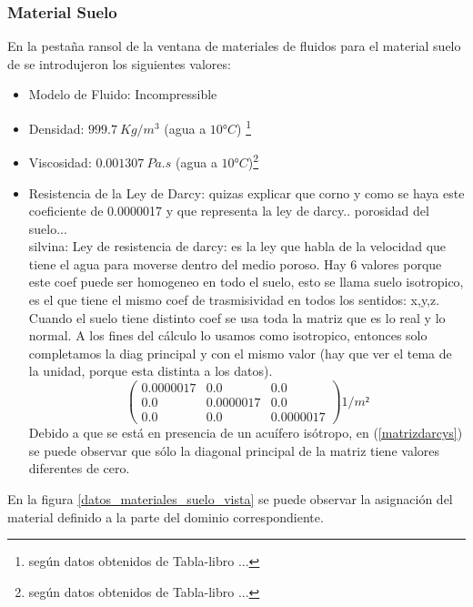 \documentclass[10pt,a4paper,final]{article}
\begin{document}
\subsubsection{Material Suelo}
En la pestaña ransol de la ventana de materiales de fluidos para el material suelo de  se introdujeron los siguientes valores:
\begin{itemize}
\item Modelo de Fluido: Incompressible
\item Densidad: $999.7~Kg/m^3$ (agua a $10° C$) \footnote{ según datos obtenidos de Tabla-libro ...}
\item Viscosidad: $0.001307~Pa.s$ (agua a $10° C$)\footnote{ según datos obtenidos de Tabla-libro ...}
\item Resistencia de la Ley de Darcy:
quizas explicar que corno y como se haya este coeficiente de 0.0000017 y que representa la ley de darcy.. porosidad del suelo...\\
silvina: Ley de resistencia de darcy: es la ley que habla de la velocidad que tiene el agua para moverse dentro del medio poroso. Hay 6 valores porque este coef puede ser homogeneo en todo el suelo, esto se llama suelo isotropico, es el que tiene el mismo coef de trasmisividad en todos los sentidos: x,y,z. Cuando el suelo tiene distinto coef se usa toda la matriz que es lo real y lo normal. A los fines del cálculo lo usamos como isotropico, entonces solo completamos la diag principal y con el mismo valor (hay que ver el tema de la unidad, porque esta distinta a los datos). 
\begin{equation}
\begin{pmatrix}{}
0.0000017 & 0.0 & 0.0 \\ 
0.0 & 0.0000017 & 0.0 \\ 
0.0 & 0.0 & 0.0000017
\end{pmatrix} 1/m²
\label{matrizdarcys}
\end{equation}
Debido a que se está en presencia de un acuífero isótropo, en (\ref{matrizdarcys}) se puede observar que sólo la diagonal principal de la matriz tiene valores diferentes de cero.
\end{itemize}
En la figura \ref{datos_materiales_suelo_vista} se puede observar la asignación del material definido a la parte del dominio correspondiente.
\end{document}
